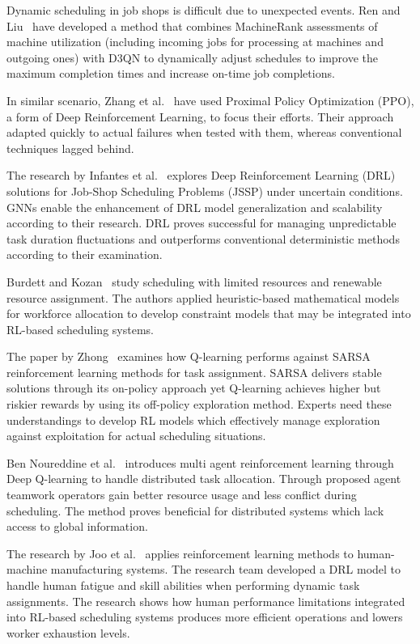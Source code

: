 \documentclass[%
aip,
cp,  %
amsmath,amssymb,
reprint,%
]{revtex4-2}
\begin{document}
	Dynamic scheduling in job shops is difficult due to unexpected events. Ren and Liu~\cite{li2024} have developed a method that combines MachineRank assessments of machine utilization (including incoming jobs for processing at machines and outgoing ones) with D3QN to dynamically adjust schedules to improve the maximum completion times and increase on-time job completions.
	
	In similar scenario, Zhang et al.~\cite{zhang2022} have used Proximal Policy Optimization (PPO), a form of Deep Reinforcement Learning, to focus their efforts. Their approach adapted quickly to actual failures when tested with them, whereas conventional techniques lagged behind.
	
	The research by Infantes et al.~\cite{infantes2024} explores Deep
	Reinforcement Learning (DRL) solutions for Job-Shop Scheduling Problems (JSSP)
	under uncertain conditions. GNNs enable the enhancement of DRL model generalization
	and scalability according to their research. DRL proves successful for
	managing unpredictable task duration fluctuations and outperforms conventional
	deterministic methods according to their examination.
	
	Burdett and Kozan~\cite{burdett2004} study scheduling with limited resources
	and renewable resource assignment. The authors applied heuristic-based mathematical
	models for workforce allocation to develop constraint models that may be integrated
	into RL-based scheduling systems.
	
	The paper by Zhong~\cite{zhong2024} examines how Q-learning performs against SARSA
	reinforcement learning methods for task assignment. SARSA delivers stable
	solutions through its on-policy approach yet Q-learning achieves higher but
	riskier rewards by using its off-policy exploration method. Experts need these
	understandings to develop RL models which effectively manage exploration against
	exploitation for actual scheduling situations.
	
	Ben Noureddine et al.~\cite{noureddine2017} introduces multi agent
	reinforcement learning through Deep Q-learning to handle distributed task
	allocation. Through proposed agent teamwork operators gain better resource usage
	and less conflict during scheduling. The method proves beneficial for
	distributed systems which lack access to global information.
	
	The research by Joo et al.~\cite{joo2022} applies reinforcement learning methods
	to human-machine manufacturing systems. The research team developed a DRL
	model to handle human fatigue and skill abilities when performing dynamic task
	assignments. The research shows how human performance limitations integrated into
	RL-based scheduling systems produces more efficient operations and lowers worker
	exhaustion levels.
	
\end{document}

